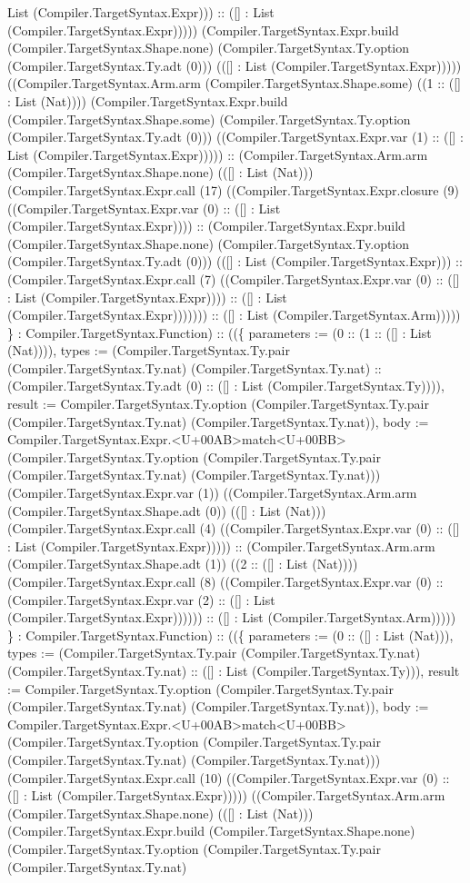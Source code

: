 \documentclass[11pt]{article}
\begin{document}
List (Compiler.TargetSyntax.Expr))) :: ([] : List (Compiler.TargetSyntax.Expr))))) (Compiler.TargetSyntax.Expr.build (Compiler.TargetSyntax.Shape.none) (Compiler.TargetSyntax.Ty.option (Compiler.TargetSyntax.Ty.adt (0))) (([] : List (Compiler.TargetSyntax.Expr))))) ((Compiler.TargetSyntax.Arm.arm (Compiler.TargetSyntax.Shape.some) ((1 :: ([] : List (Nat)))) (Compiler.TargetSyntax.Expr.build (Compiler.TargetSyntax.Shape.some) (Compiler.TargetSyntax.Ty.option (Compiler.TargetSyntax.Ty.adt (0))) ((Compiler.TargetSyntax.Expr.var (1) :: ([] : List (Compiler.TargetSyntax.Expr))))) :: (Compiler.TargetSyntax.Arm.arm (Compiler.TargetSyntax.Shape.none) (([] : List (Nat))) (Compiler.TargetSyntax.Expr.call (17) ((Compiler.TargetSyntax.Expr.closure (9) ((Compiler.TargetSyntax.Expr.var (0) :: ([] : List (Compiler.TargetSyntax.Expr)))) :: (Compiler.TargetSyntax.Expr.build (Compiler.TargetSyntax.Shape.none) (Compiler.TargetSyntax.Ty.option (Compiler.TargetSyntax.Ty.adt (0))) (([] : List (Compiler.TargetSyntax.Expr))) :: (Compiler.TargetSyntax.Expr.call (7) ((Compiler.TargetSyntax.Expr.var (0) :: ([] : List (Compiler.TargetSyntax.Expr)))) :: ([] : List (Compiler.TargetSyntax.Expr))))))) :: ([] : List (Compiler.TargetSyntax.Arm))))) \} : Compiler.TargetSyntax.Function) :: ((\{ parameters := (0 :: (1 :: ([] : List (Nat)))), types := (Compiler.TargetSyntax.Ty.pair (Compiler.TargetSyntax.Ty.nat) (Compiler.TargetSyntax.Ty.nat) :: (Compiler.TargetSyntax.Ty.adt (0) :: ([] : List (Compiler.TargetSyntax.Ty)))), result := Compiler.TargetSyntax.Ty.option (Compiler.TargetSyntax.Ty.pair (Compiler.TargetSyntax.Ty.nat) (Compiler.TargetSyntax.Ty.nat)), body := Compiler.TargetSyntax.Expr.<U+00AB>match<U+00BB> (Compiler.TargetSyntax.Ty.option (Compiler.TargetSyntax.Ty.pair (Compiler.TargetSyntax.Ty.nat) (Compiler.TargetSyntax.Ty.nat))) (Compiler.TargetSyntax.Expr.var (1)) ((Compiler.TargetSyntax.Arm.arm (Compiler.TargetSyntax.Shape.adt (0)) (([] : List (Nat))) (Compiler.TargetSyntax.Expr.call (4) ((Compiler.TargetSyntax.Expr.var (0) :: ([] : List (Compiler.TargetSyntax.Expr))))) :: (Compiler.TargetSyntax.Arm.arm (Compiler.TargetSyntax.Shape.adt (1)) ((2 :: ([] : List (Nat)))) (Compiler.TargetSyntax.Expr.call (8) ((Compiler.TargetSyntax.Expr.var (0) :: (Compiler.TargetSyntax.Expr.var (2) :: ([] : List (Compiler.TargetSyntax.Expr)))))) :: ([] : List (Compiler.TargetSyntax.Arm))))) \} : Compiler.TargetSyntax.Function) :: ((\{ parameters := (0 :: ([] : List (Nat))), types := (Compiler.TargetSyntax.Ty.pair (Compiler.TargetSyntax.Ty.nat) (Compiler.TargetSyntax.Ty.nat) :: ([] : List (Compiler.TargetSyntax.Ty))), result := Compiler.TargetSyntax.Ty.option (Compiler.TargetSyntax.Ty.pair (Compiler.TargetSyntax.Ty.nat) (Compiler.TargetSyntax.Ty.nat)), body := Compiler.TargetSyntax.Expr.<U+00AB>match<U+00BB> (Compiler.TargetSyntax.Ty.option (Compiler.TargetSyntax.Ty.pair (Compiler.TargetSyntax.Ty.nat) (Compiler.TargetSyntax.Ty.nat))) (Compiler.TargetSyntax.Expr.call (10) ((Compiler.TargetSyntax.Expr.var (0) :: ([] : List (Compiler.TargetSyntax.Expr))))) ((Compiler.TargetSyntax.Arm.arm (Compiler.TargetSyntax.Shape.none) (([] : List (Nat))) (Compiler.TargetSyntax.Expr.build (Compiler.TargetSyntax.Shape.none) (Compiler.TargetSyntax.Ty.option (Compiler.TargetSyntax.Ty.pair (Compiler.TargetSyntax.Ty.nat) 
\end{document}
